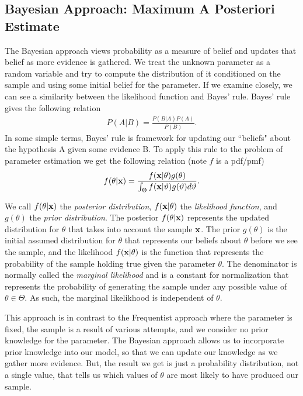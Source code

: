 \subsection*{Bayesian Approach: Maximum A Posteriori Estimate}
The Bayesian approach views probability as a measure of belief and updates that belief as more evidence is gathered.
We treat the unknown parameter as a random variable and try to compute the distribution of it conditioned on the sample and using some initial belief for the parameter.
If we examine closely, we can see a similarity between the likelihood function and Bayes' rule. Bayes' rule gives the following relation
\begin{align*}
  P(A| B) = \frac{P(B | A)P(A)}{P(B)}.
\end{align*}
In some simple terms, Bayes' rule is framework for updating our ``beliefs" about the hypothesis A given some evidence B.
To apply this rule to the problem of parameter estimation we get the following relation (note $f$ is a pdf/pmf)
\begin{align}\label{eq:cont_bayes}
  f(\theta | \mathbf{x}) = \frac{f(\mathbf{x} | \theta)g(\theta)}{\int_{\Theta}f(\mathbf{x} | \vartheta)g(\vartheta) d\vartheta}.
\end{align}

We call $f(\theta | \mathbf{x})$ the \emph{posterior distribution}, $f(\mathbf{x}| \theta)$ the \emph{likelihood function}, and $g(\theta)$ the \emph{prior distribution}.
The posterior $f(\theta | \mathbf{x})$ represents the updated distribution for $\theta$ that takes into account the sample $\mathbf{x}$.
The prior $g(\theta)$ is the initial assumed distribution for $\theta$ that represents our beliefs about $\theta$ before we see the sample, and the likelihood $f(\mathbf{x} | \theta)$ is the function that represents the probability of the sample holding true given the parameter $\theta$.
The denominator is normally called the \emph{marginal likelihood} and is a constant for normalization that represents the probability of generating the sample under any possible value of $\theta\in\Theta$.
As such, the marginal likelikhood is independent of $\theta$.

This approach is in contrast to the Frequentist approach where the parameter is fixed, the sample is a result of various attempts, and we consider no prior knowledge for the parameter.
The Bayesian approach allows us to incorporate prior knowledge into our model, so that we can update our knowledge as we gather more evidence.
But, the result we get is just a probability distribution, not a single value, that tells us which values of $\theta$ are most likely to have produced our sample.

